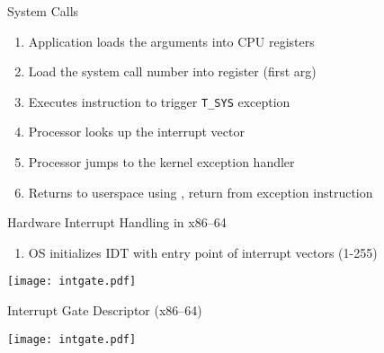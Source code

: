 \documentclass[11pt,aspectratio=169]{beamer}
\begin{document}
\begin{slide}{System Calls}
\begin{enumerate}
\item Application loads the arguments into CPU registers
\item Load the system call number into register  (first arg)
\item Executes  instruction to trigger \texttt{T\_SYS} exception
\item Processor looks up the interrupt vector
\item Processor jumps to the kernel exception handler
\item Returns to userspace using , return from exception instruction
\end{enumerate}
\end{slide}

\begin{slide}{Hardware Interrupt Handling in x86--64}
\begin{enumerate}
\item OS initializes IDT with entry point of interrupt vectors (1-255)
\end{enumerate}
\centerline{
    \texttt{[image: intgate.pdf]}
}
\end{slide}

\begin{slide}{Interrupt Gate Descriptor (x86--64)}
\centerline{
    \texttt{[image: intgate.pdf]}
}
\end{slide}
\end{document}
